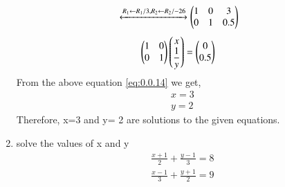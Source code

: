 \documentclass[journal,12pt,twocolumn]{IEEEtran}
\renewcommand\thesection{\arabic{section}}
\begin{document}
\begin{enumerate}[label=\thesection.\arabic*.,ref=\thesection.\theenumi]
\begin{align}
   & \xleftrightarrow[]{ R_1 \leftarrow R_1/3,R_2 \leftarrow R_2/-26}
  \begin{pmatrix}1&0&3\\0&1&0.5\end{pmatrix}&
 \end{align}
 \begin{align}
&\myvec{1&0\\0&1} \myvec{x\\\displaystyle\frac{1}{y}}= \myvec{0\\0.5}& \label{eq:0.0.14}
\medskip
\end{align}
From the above equation \eqref{eq:0.0.14} we get,
\begin{align}
&x=3&\\
&y=2&
\end{align}
Therefore, x=3 and y= 2 are solutions to the given equations.
\item 
solve the values of x and y
\begin{align}
\displaystyle\frac{x+1}{2}+\displaystyle\frac{y-1}{3}=8\\
\displaystyle\frac{x-1}{3}+\displaystyle\frac{y+1}{2}=9\end{align}


\end{enumerate}
\end{document}
